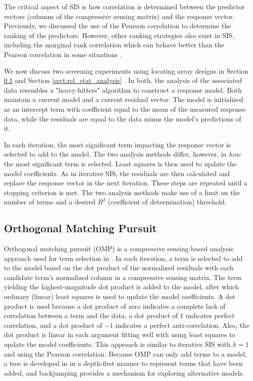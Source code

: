 The critical aspect of SIS is how correlation is determined between the predictor vectors (columns of the compressive sensing matrix) and the response vector.
Previously, we discussed the use of the Pearson correlation to determine the ranking of the predictors.
However, other ranking strategies also exist in SIS, including the marginal rank correlation which can behave better than the Pearson correlation in some situations \cite{SIS}.

We now discuss two screening experiments using locating array designs in Section \ref{sect:rel_dfs_analysis} \cite{Compton-et-al-LA} and Section \ref{sect:rel_stat_analysis} \cite{AldacoCS15}.
In both, the analysis of the associated data resembles a "heavy-hitters" algorithm to construct a response model.
Both maintain a current model and a current residual vector.
The model is initialized as an intercept term with coefficient equal to the mean of the measured response data, while the residuals are equal to the data minus the model's predictions of it. 

In each iteration, the most significant term impacting the response vector is selected to add to the model.
The two analysis methods differ, however, in \textit{how} the most significant term is selected.
Least squares is then used to update the model coefficients.
As in iterative SIS, the residuals are then calculated and replace the response vector in the next iteration.
These steps are repeated until a stopping criterion is met. 
The two analysis methods make use of a limit on the number of terms and a desired $R^2$ (coefficient of determination) threshold.

\subsection{Orthogonal Matching Pursuit} \label{sect:rel_dfs_analysis}

Orthogonal matching pursuit (OMP) is a compressive sensing-based analysis approach used for term selection in \cite{Compton-et-al-LA}.
In each iteration, a term is selected to add to the model based on the dot product of the normalized residuals with each candidate term's normalized column in a compressive sensing matrix.
The term yielding the highest-magnitude dot product is added to the model, after which ordinary (linear) least squares is used to update the model coefficients.
A dot product is used because a dot product of zero indicates a complete lack of correlation between a term and the data, a dot product of $1$ indicates perfect correlation, and a dot product of $-1$ indicates a perfect anti-correlation. 
Also, the dot product is linear in each argument fitting well with using least squares to update the model coefficients.
This approach is similar to iterative SIS with $k = 1$ and using the Pearson correlation.
Because OMP can only add terms to a model, a tree is developed in \cite{Compton-et-al-LA} in a depth-first manner to represent terms that have been added, and backjumping provides a mechanism for exploring alternative models.

